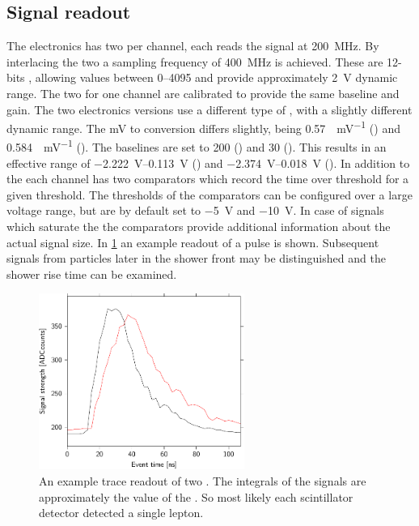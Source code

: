 \subsection{Signal readout}

The \hisparc electronics has two \adcs per channel, each \adc reads the \pmt signal at \SI{200}{\mega\hertz}. By interlacing the two \adcs a sampling frequency of \SI{400}{\mega\hertz} is achieved. These are 12-bits \adcs, allowing values between \SIrange{0}{4095}{\adc} and provide approximately \SI{2}{\volt} dynamic range. The two \adcs for one channel are calibrated to provide the same baseline and gain. The two electronics versions use a different type of \adc, with a slightly different dynamic range. The \si{\mV} to \si{\adc} conversion differs slightly, being \SI{0.57}{\adc\per\mV} (\hisparcii) and \SI{0.584}{\adc\per\mV} (\hisparciii). The baselines are set to \SI{200}{\adc} (\hisparcii) and \SI{30}{\adc} (\hisparciii). This results in an effective range of \SIrange{-2.222}{0.113}{\volt} (\hisparcii) and \SIrange{-2.374}{0.018}{\volt} (\hisparciii). In addition to the \adcs each channel has two comparators which record the time over threshold for a given threshold. The thresholds of the comparators can be configured over a large voltage range, but are by default set to \SI{-5}{\volt} and \SI{-10}{\volt}. In case of signals which saturate the \adcs the comparators provide additional information about the actual signal size. In \cref{fig:trace} an example readout of a pulse is shown. Subsequent signals from particles later in the shower front may be distinguished and the shower rise time can be examined.

\begin{figure}
    \centering
    \includegraphics[width=0.6\textwidth]
                    {plots/station/trace_3501_1452556812_204602455}
    \caption{An example trace readout of two \pmts. The integrals of the signals are approximately the value of the \mpv. So most likely each scintillator detector detected a single lepton.}
    \label{fig:trace}
\end{figure}


